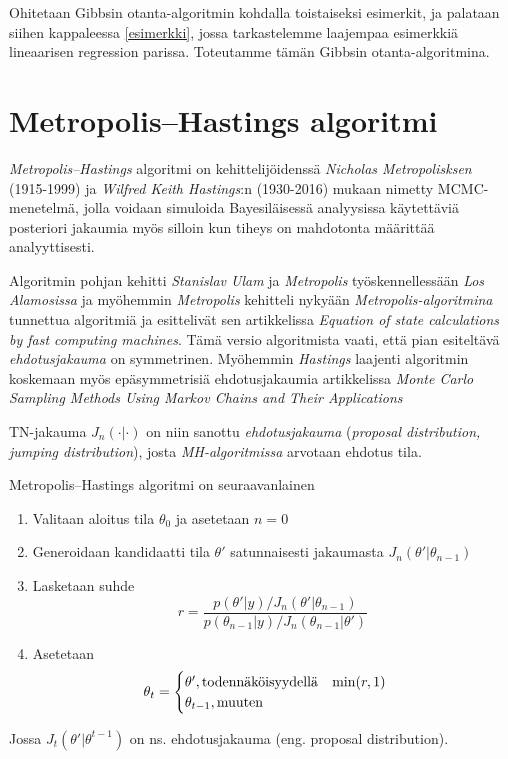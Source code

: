 Ohitetaan Gibbsin otanta-algoritmin kohdalla toistaiseksi esimerkit, ja palataan siihen kappaleessa \ref{esimerkki}, jossa tarkastelemme laajempaa esimerkkiä lineaarisen regression parissa. Toteutamme tämän Gibbsin otanta-algoritmina.

\section{Metropolis--Hastings algoritmi}\label{Metropolis--Hastings algoritmi}

\textit{Metropolis--Hastings} algoritmi on kehittelijöidenssä \textit{Nicholas Metropolisksen} (1915-1999) ja \textit{Wilfred Keith Hastings}:n (1930-2016) mukaan nimetty MCMC-menetelmä, jolla voidaan simuloida Bayesiläisessä analyysissa käytettäviä posteriori jakaumia myös silloin kun tiheys on mahdotonta määrittää analyyttisesti.

Algoritmin pohjan kehitti \textit{Stanislav Ulam} ja \textit{Metropolis} työskennellessään \textit{Los Alamosissa} ja myöhemmin \textit{Metropolis} kehitteli nykyään \textit{Metropolis-algoritmina} tunnettua algoritmiä ja esittelivät sen artikkelissa \textit{Equation of state calculations by fast computing machines}\cite{metropolis_nicholas_equation_1953}. Tämä versio algoritmista vaati, että pian esiteltävä \textit{ehdotusjakauma} on symmetrinen. Myöhemmin \textit{Hastings} laajenti algoritmin koskemaan myös epäsymmetrisiä ehdotusjakaumia artikkelissa \textit{Monte Carlo Sampling Methods Using Markov Chains and Their Applications}

\begin{merk}
	TN-jakauma $J_n(\cdot|\cdot)$ on niin sanottu \textit{ehdotusjakauma} (\textit{proposal distribution, jumping distribution}), josta \textit{MH-algoritmissa} arvotaan ehdotus tila.
\end{merk}

\begin{maar}\label{mh-maar}
	Metropolis--Hastings algoritmi on seuraavanlainen
	\begin{enumerate}
		\item Valitaan aloitus tila $\theta_0$ ja asetetaan $n=0$
		\item Generoidaan kandidaatti tila $\theta'$ satunnaisesti jakaumasta $J_n(\theta'|\theta_{n-1})$
		\item Lasketaan suhde
		\begin{displaymath}
			r = \frac{p(\theta'|y)/J_n(\theta'|\theta_{n-1})}{p(\theta_{n-1}|y)/J_n(\theta_{n-1}|\theta')}
		\end{displaymath}
		\item Asetetaan
		\begin{displaymath}
			\theta_t= 
			\begin{cases}
				\theta', \text{todennäköisyydellä} \hspace{0.3cm} \min(r,1) \\
				\theta_{t-1}, \text{muuten}
			\end{cases}
		\end{displaymath}
	\end{enumerate}
	Jossa $J_t(\theta'|\theta^{t-1})$ on ns. ehdotusjakauma (eng. proposal distribution).
\end{maar}


